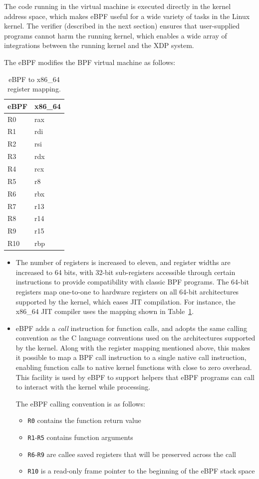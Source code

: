 \documentclass[10pt]{sig-alternate-05-2015}
\begin{document}
The code running in the virtual machine is executed directly in the kernel
address space, which makes eBPF useful for a wide variety of tasks in the Linux
kernel. The verifier (described in the next section) ensures that user-supplied
programs cannot harm the running kernel, which enables a wide array of
integrations between the running kernel and the XDP system.

The eBPF modifies the BPF virtual machine as follows:

\begin{table}[htbp]
\caption{\label{tbl:reg-map}
eBPF to x86\_64 register mapping.}
\centering
\begin{tabular}{ll}
\toprule
eBPF & x86\_64\\
\midrule
R0 & rax\\
R1 & rdi\\
R2 & rsi\\
R3 & rdx\\
R4 & rcx\\
R5 & r8\\
R6 & rbx\\
R7 & r13\\
R8 & r14\\
R9 & r15\\
R10 & rbp\\
\bottomrule
\end{tabular}
\end{table}


\begin{itemize}
\item The number of registers is increased to eleven, and register widths are
increased to 64 bits, with 32-bit sub-registers accessible through certain
instructions to provide compatibility with classic BPF programs. The 64-bit
registers map one-to-one to hardware registers on all 64-bit architectures
supported by the kernel, which eases JIT compilation. For instance, the x86\_64
JIT compiler uses the mapping shown in Table \ref{tbl:reg-map}.

\item eBPF adds a \emph{call} instruction for function calls, and adopts the same calling
convention as the C language conventions used on the architectures supported
by the kernel. Along with the register mapping mentioned above, this makes it
possible to map a BPF call instruction to a single native call instruction,
enabling function calls to native kernel functions with close to zero
overhead. This facility is used by eBPF to support helpers that eBPF programs
can call to interact with the kernel while processing.

The eBPF calling convention is as follows:
\begin{itemize}
\item \texttt{R0} contains the function return value
\item \texttt{R1}-\texttt{R5} contains function arguments
\item \texttt{R6}-\texttt{R9} are callee saved registers that will be preserved across the call
\item \texttt{R10} is a read-only frame pointer to the beginning of the eBPF stack space
\end{itemize}
\end{itemize}
\end{document}
